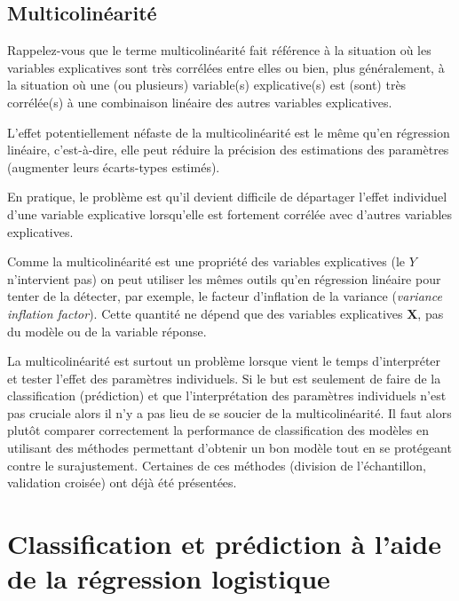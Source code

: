 \documentclass[
  11pt,
  letterpaper,
]{book}
\theoremstyle{definition}
\theoremstyle{definition}
\theoremstyle{definition}
\theoremstyle{remark}
\begin{document}
\hypertarget{multicolinuxe9arituxe9}{%
\subsection{Multicolinéarité}\label{multicolinuxe9arituxe9}}

Rappelez-vous que le terme multicolinéarité fait référence à la situation où les variables explicatives sont très corrélées entre elles ou bien, plus généralement, à la situation où une (ou plusieurs) variable(s) explicative(s) est (sont) très corrélée(s) à une combinaison linéaire des autres variables explicatives.

L'effet potentiellement néfaste de la multicolinéarité est le même qu'en régression linéaire, c'est-à-dire, elle peut réduire la précision des estimations des paramètres (augmenter leurs écarts-types estimés).

En pratique, le problème est qu'il devient difficile de départager l'effet individuel d'une variable explicative lorsqu'elle est fortement corrélée avec d'autres variables explicatives.

Comme la multicolinéarité est une propriété des variables explicatives (le \(Y\) n'intervient pas) on peut utiliser les mêmes outils qu'en régression linéaire pour tenter de la détecter, par exemple, le facteur d'inflation de la variance (\emph{variance inflation factor}). Cette quantité ne dépend que des variables explicatives \(\boldsymbol{X}\), pas du modèle ou de la variable réponse.

La multicolinéarité est surtout un problème lorsque vient le temps d'interpréter et tester l'effet des paramètres individuels. Si le but est seulement de faire de la classification (prédiction) et que l'interprétation des paramètres individuels n'est pas cruciale alors il n'y a pas lieu de se soucier de la multicolinéarité. Il faut alors plutôt comparer correctement la performance de classification des modèles en utilisant des méthodes permettant d'obtenir un bon modèle tout en se protégeant contre le surajustement. Certaines de ces méthodes (division de l'échantillon, validation croisée) ont déjà été présentées.

\hypertarget{classification-et-pruxe9diction-uxe0-laide-de-la-ruxe9gression-logistique}{%
\section{Classification et prédiction à l'aide de la régression logistique}\label{classification-et-pruxe9diction-uxe0-laide-de-la-ruxe9gression-logistique}}
\end{document}
